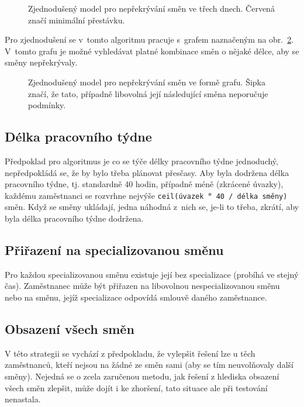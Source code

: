 \documentclass[twoside]{ctuthesis}
\begin{document}
\begin{enumerate}[label=\textbf{O\arabic*.}]
\begin{figure}[h!]
	
	\caption{Zjednodušený model pro nepřekrývání směn ve třech dnech. Červená značí minimální přestávku.}
	\label{fig:shiftprecedencefull}
\end{figure}

Pro zjednodušení se v~tomto algoritmu pracuje s~grafem naznačeným na obr.~\ref{fig:shiftprecedence}. V~tomto grafu je možné vyhledávat platné kombinace směn o nějaké délce, aby se směny nepřekrývaly.

\begin{figure}[h!]
	
	\caption{Zjednodušený model pro nepřekrývání směn ve formě grafu. Šipka značí, že tato, případně libovolná její následující směna neporučuje podmínky.}
	\label{fig:shiftprecedence}
\end{figure}


\subsection{Délka pracovního týdne}
Předpoklad pro algoritmus je co se týče délky pracovního týdne jednoduchý, nepředpokládá se, že by bylo třeba plánovat přesčasy. Aby byla dodržena délka pracovního týdne, tj. standardně 40 hodin, případně méně (zkrácené úvazky), každému zaměstnanci se rozvrhne nejvýše \texttt{ceil(úvazek $\ast$ 40 / délka směny)} směn. Když se směny ukládají, jedna náhodná z~nich se, je-li to třeba, zkrátí, aby byla délka pracovního týdne dodržena.

\subsection{Přiřazení na specializovanou směnu}

Pro každou specializovanou směnu existuje její  bez specializace (probíhá ve stejný čas). Zaměstnanec může být přiřazen na libovolnou nespecializovanou směnu nebo na směnu, jejíž specializace odpovídá smlouvě daného zaměstnance.

\subsection{Obsazení všech směn}
V této strategii se vychází z předpokladu, že vylepšit řešení lze u těch zaměstnanců, kteří nejsou na žádné ze směn sami (aby se tím neuvolňovaly další směny). Nejedná se o zcela zaručenou metodu, jak řešení z hlediska obsazení všech směn zlepšit, může dojít i ke zhoršení, tato situace ale při testování nenastala.


\end{enumerate}
\end{document}
